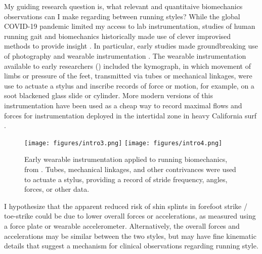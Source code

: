 My guiding research question is, what relevant and quantitaive biomechanics observations can I make regarding between running styles?  While the global COVID-19 pandemic limited my access to lab instrumentation, studies of human running gait and biomechanics historically made use of clever improvised methods to provide insight \citep{baker2007history, mcmahon1984muscles, mayer2010physiological, marey1873locomotion, carlet1872essai, muybridge1901human}. In particular, early studies made groundbreaking use of photography \citep{muybridge1901human, baker2007history, mcmahon1984muscles, mayer2010physiological} and wearable instrumentation \citep{marey1873locomotion, carlet1872essai, baker2007history, mayer2010physiological}. The wearable instrumentation available to early researchers () included the kymograph, in which movement of limbs or pressure of the feet, transmitted via tubes or mechanical linkages, were use to actuate a stylus and inscribe records of force or motion, for example, on a soot blackened glass slide or cylinder. More modern versions of this instrumentation have been used as a cheap way to record maximal flows and forces for instrumentation deployed in the intertidal zone in heavy California surf \citep{bell1984quantifying, denny1983simple}.
\begin{figure}
\begin{center}
\texttt{[image: figures/intro3.png]}\hspace{0.5in}
\texttt{[image: figures/intro4.png]}
\end{center}
\caption{Early wearable instrumentation applied to running biomechanics, from \citep{marey1873locomotion, carlet1872essai}. Tubes, mechanical linkages, and other contrivances were used to actuate a stylus, providing a record of stride frequency, angles, forces, or other data.} 
\label{fig:intro}
\end{figure}

I hypothesize that the apparent reduced risk of shin splints in forefoot strike / toe-strike could be due to lower overall forces or accelerations, as measured using a force plate or wearable accelerometer. Alternatively, the overall forces and accelerations may be similar between the two styles, but may have fine kinematic details that suggest a mechanism for clinical observations regarding running style. 



